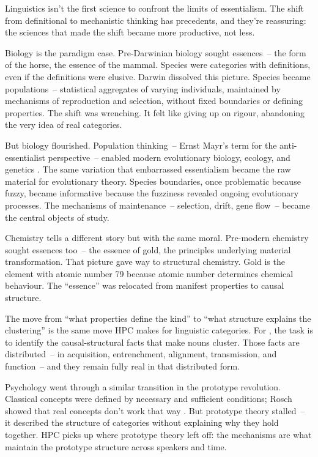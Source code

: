 Linguistics isn't the first science to confront the limits of essentialism. The shift from definitional to mechanistic thinking has precedents, and they're reassuring: the sciences that made the shift became more productive, not less.

Biology is the paradigm case. Pre-Darwinian biology sought essences~-- the form of the horse, the essence of the mammal. Species were categories with definitions, even if the definitions were elusive. Darwin dissolved this picture. Species became populations~-- statistical aggregates of varying individuals, maintained by mechanisms of reproduction and selection, without fixed boundaries or defining properties. The shift was wrenching. It felt like giving up on rigour, abandoning the very idea of real categories.

But biology flourished. Population thinking~-- Ernst Mayr's term for the anti-essentialist perspective~-- enabled modern evolutionary biology, ecology, and genetics \citep{mayr1959,mayr1982}. The same variation that embarrassed essentialism became the raw material for evolutionary theory. Species boundaries, once problematic because fuzzy, became informative because the fuzziness revealed ongoing evolutionary processes. The mechanisms of maintenance~-- selection, drift, gene flow~-- became the central objects of study.

Chemistry tells a different story but with the same moral. Pre-modern chemistry sought essences too~-- the essence of gold, the principles underlying material transformation. That picture gave way to structural chemistry. Gold is the element with atomic number 79 because atomic number determines chemical behaviour. The \enquote{essence} was relocated from manifest properties to causal structure.

The move from \enquote{what properties define the kind} to \enquote{what structure explains the clustering} is the same move HPC makes for linguistic categories. For , the task is to identify the causal-structural facts that make nouns cluster. Those facts are distributed~-- in acquisition, entrenchment, alignment, transmission, and function~-- and they remain fully real in that distributed form.

Psychology went through a similar transition in the prototype revolution. Classical concepts were defined by necessary and sufficient conditions; Rosch showed that real concepts don't work that way \citep{rosch1973,rosch1978}. But prototype theory stalled~-- it described the structure of categories without explaining why they hold together. HPC picks up where prototype theory left off: the mechanisms are what maintain the prototype structure across speakers and time.


